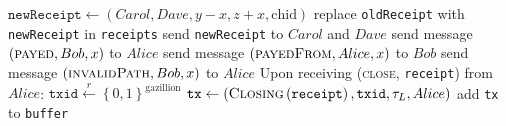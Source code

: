 \begin{algorithm}
\begin{algorithmic}[1]
          \State $\mathtt{newReceipt} \gets \left(Carol, Dave, y - x, z + x,
          \mathrm{chid}\right)$
          \State replace \texttt{oldReceipt} with \texttt{newReceipt} in
          \texttt{receipts}
          \State send \texttt{newReceipt} to $Carol$ and $Dave$
        \EndFor
        \State send message $\left(\textsc{payed}, Bob, x\right)$ to $Alice$
        \State send message $\left(\textsc{payedFrom}, Alice, x\right)$ to $Bob$
      \Else
        \State send message $\left(\textsc{invalidPath}, Bob, x\right)$ to $Alice$
      \EndIf
    \EndIndent
    \State
    \State Upon receiving (\textsc{close}, \texttt{receipt}) from $Alice$:
    \Indent
        \State $\mathtt{txid} \overset{r}{\gets} \left\{0,
        1\right\}^{\mathrm{gazillion}}$
        \State $\mathtt{tx} \gets
        \left(\textsc{Closing}\left(\mathtt{receipt}\right), \mathtt{txid},
        \tau_L, Alice\right)$
        \State add \texttt{tx} to \texttt{buffer}
      \EndIf
    \EndIndent
  \end{algorithmic}
\end{algorithm}
